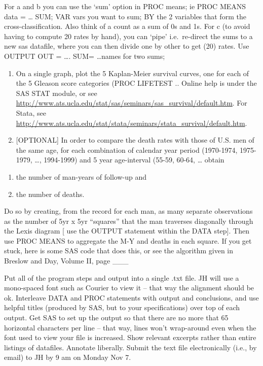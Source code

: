 \documentclass[]{book}
\begin{document}
For a and b you can use the `sum' option in PROC means;
ie PROC MEANS data = \ldots{} SUM; VAR vars you want to sum;
BY the 2 variables that form the cross-classification.
Also think of a count as a sum of 0s and 1s.
For c (to avoid having to compute 20 rates by hand), you can `pipe' i.e.~re-direct the sums to a new sas datafile, where you can then divide one by other to get (20) rates. Use OUTPUT OUT = \ldots{}. SUM= \ldots{}names for two sums;

\begin{enumerate}
\def\labelenumi{\arabic{enumi}.}
\setcounter{enumi}{2}
\item
  On a single graph, plot the 5 Kaplan-Meier survival curves, one for each of the 5 Gleason score categories (PROC LIFETEST .. Online help is under the SAS STAT module, or see \url{http://www.ats.ucla.edu/stat/sas/seminars/sas_survival/default.htm}. For Stata, see \url{http://www.ats.ucla.edu/stat/stata/seminars/stata_survival/default.htm}.
\item
  {[}OPTIONAL{]} In order to compare the death rates with those of U.S. men of the same age, for each combination of calendar year period (1970-1974, 1975-1979, \ldots{}, 1994-1999) and 5 year age-interval (55-59, 60-64, \ldots{} obtain
\end{enumerate}

\begin{enumerate}
\def\labelenumi{\alph{enumi}.}
\item
  the number of man-years of follow-up and
\item
  the number of deaths.
\end{enumerate}

Do so by creating, from the record for each man, as many separate observations as the number of 5yr x 5yr ``squares'' that the man traverses diagonally through the Lexis diagram {[} use the OUTPUT statement within the DATA step{]}. Then use PROC MEANS to aggregate the M-Y and deaths in each square. If you get stuck, here is some SAS code that does this, or see the algorithm given in Breslow and Day, Volume II, page \_\_\_

Put all of the program steps and output into a single .txt file. JH will use a mono-spaced font such as Courier to view it -- that way the alignment should be ok. Interleave DATA and PROC statements with output and conclusions, and use helpful titles (produced by SAS, but to your specifications) over top of each output. Get SAS to set up the output so that there are no more that 65 horizontal characters per line -- that way, lines won't wrap-around even when the font used to view your file is increased. Show relevant excerpts rather than entire listings of datafiles. Annotate liberally. Submit the text file electronically (i.e., by email) to JH by 9 am on Monday Nov 7.
\end{document}

